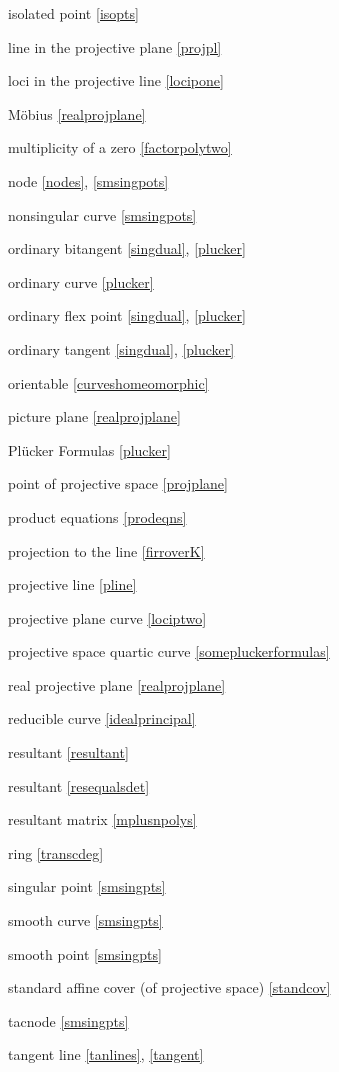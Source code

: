 \documentclass[leqno]{book}
\theoremstyle{definition}%
\numberwithin{equation}{section}
\theoremstyle{theorem} %
\begin{document}
\no
isolated point \ref{isopts}

\no
line in the projective plane \ref{projpl}

\no
loci in the projective line \ref{locipone}

\no
M\"obius \ref{realprojplane}

\no
multiplicity of a zero \ref{factorpolytwo}

\no
node \ref{nodes}, \ref{smsingpots}


\no
nonsingular curve \ref{smsingpots}

\no
ordinary bitangent \ref{singdual}, \ref{plucker}


\no
ordinary curve \ref{plucker}

\no
ordinary flex point \ref{singdual}, \ref{plucker}

\no
ordinary tangent \ref{singdual}, \ref{plucker}


\no
orientable \ref{curveshomeomorphic}

\no
picture plane \ref{realprojplane}

\no
Pl\"ucker Formulas \ref{plucker}

\no
point of projective space \ref{projplane}

\no
product equations \ref{prodeqns}

\no
projection to the line \ref{firroverK}

\no
projective line \ref{pline}

\no
projective plane curve \ref{lociptwo}

\no
projective space 
quartic curve \ref{somepluckerformulas}

\no
real projective plane \ref{realprojplane}

\no
reducible curve \ref{idealprincipal}

\no
resultant  \ref{resultant}

\no
resultant \ref{resequalsdet}

\no
resultant matrix \ref{mplusnpolys}

\no
ring \ref{transcdeg}

\no
singular point \ref{smsingpts}

\no
smooth curve \ref{smsingpts}

\no
smooth point \ref{smsingpts}

\no
standard affine cover (of projective space) \ref{standcov}

\no
tacnode \ref{smsingpts}

\no
tangent line  \ref{tanlines}, \ref{tangent}
\end{document}
